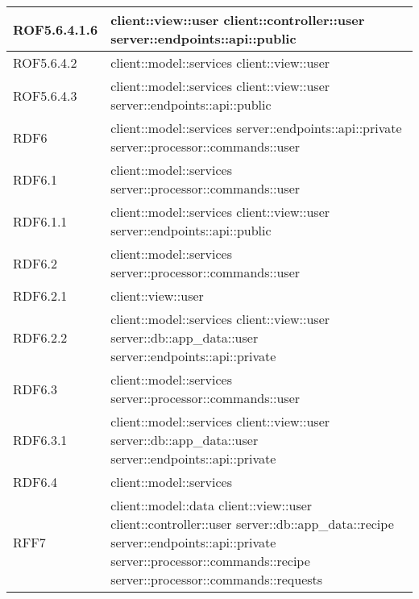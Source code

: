 \begin{center}
\begin{longtable}{| p{4cm} | p{8cm} |}
\hline
ROF5.6.4.1.6 & client::view::user \newline client::controller::user \newline server::endpoints::api::public \\
\hline
ROF5.6.4.2 & client::model::services \newline client::view::user \\
\hline
ROF5.6.4.3 & client::model::services \newline client::view::user \newline server::endpoints::api::public \\
\hline
RDF6 & client::model::services \newline server::endpoints::api::private \newline server::processor::commands::user \\
\hline
RDF6.1 & client::model::services \newline server::processor::commands::user \\
\hline
RDF6.1.1 & client::model::services \newline client::view::user \newline server::endpoints::api::public \\
\hline
RDF6.2 & client::model::services \newline server::processor::commands::user \\
\hline
RDF6.2.1 & client::view::user \\
\hline
RDF6.2.2 & client::model::services \newline client::view::user \newline server::db::app\_data::user \newline server::endpoints::api::private \\
\hline
RDF6.3 & client::model::services \newline server::processor::commands::user \\
\hline
RDF6.3.1 & client::model::services \newline client::view::user \newline server::db::app\_data::user \newline server::endpoints::api::private \\
\hline
RDF6.4 & client::model::services \\
\hline
RFF7 & client::model::data \newline client::view::user \newline client::controller::user \newline server::db::app\_data::recipe \newline server::endpoints::api::private \newline server::processor::commands::recipe \newline server::processor::commands::requests \\

\end{longtable}
\end{center}
